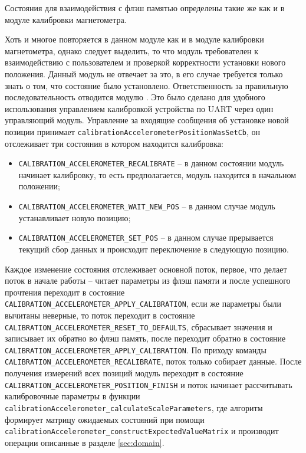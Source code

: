 Состояния для взаимодействия с флэш памятью определены такие же как и в модуле калибровки магнетометра. 

Хоть и многое повторяется в данном модуле как и в модуле калибровки магнетометра, однако следует выделить,
то что модуль требователен к взаимодействию с пользователем и проверкой корректности
установки нового положения. Данный модуль не отвечает за это, в его случае требуется только знать о том, что состояние было установлено. Ответственность
за правильную последовательность отводится модулю \moduleCalibControl . Это было сделано для удобного использования управлением калибровкой устройства по
UART через один управляющий модуль. Управление за входящие сообщения об установке новой позиции принимает \lstinline{calibrationAccelerometerPositionWasSetCb},
он отслеживает три состояния в котором находится калибровка:

\begin{itemize}
    \item \lstinline{CALIBRATION_ACCELEROMETER_RECALIBRATE} -- в данном состоянии модуль начинает калибровку, то есть предполагается, модуль находится в начальном положении;
    \item \lstinline{CALIBRATION_ACCELEROMETER_WAIT_NEW_POS} -- в данном случае модуль устанавливает новую позицию;
    \item \lstinline{CALIBRATION_ACCELEROMETER_SET_POS} -- в данном случае прерывается текущий сбор данных и происходит переключение в следующую позицию.
\end{itemize}


Каждое изменение состояния отслеживает основной поток, первое, что делает поток в начале работы -- читает параметры из флэш памяти и после успешного прочтения переходит в состояние
\lstinline{CALIBRATION_ACCELEROMETER_APPLY_CALIBRATION}, если же параметры были вычитаны неверные, то поток переходит в состояние
\lstinline{CALIBRATION_ACCELEROMETER_RESET_TO_DEFAULTS}, сбрасывает значения и записывает их обратно во флэш память, после переходит обратно в состояние
\lstinline{CALIBRATION_ACCELEROMETER_APPLY_CALIBRATION}. По приходу команды \lstinline{CALIBRATION_ACCELEROMETER_RECALIBRATE}, поток только
собирает данные.
После получения измерений всех позиций модуль переходит в состояние \lstinline{CALIBRATION_ACCELEROMETER_POSITION_FINISH} и поток начинает рассчитывать калибровочные параметры в функции 
\lstinline{calibrationAccelerometer_calculateScaleParameters}, где алгоритм формирует матрицу ожидаемых состояний при помощи
\lstinline{calibrationAccelerometer_constructExpectedValueMatrix} и производит операции описанные в разделе \ref{sec:domain}.

